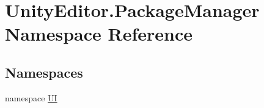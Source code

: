\hypertarget{namespace_unity_editor_1_1_package_manager}{}\section{Unity\+Editor.\+Package\+Manager Namespace Reference}
\label{namespace_unity_editor_1_1_package_manager}
\subsection*{Namespaces}
\begin{DoxyCompactItemize}
\item 
namespace \mbox{\hyperlink{namespace_unity_editor_1_1_package_manager_1_1_u_i}{UI}}
\end{DoxyCompactItemize}
